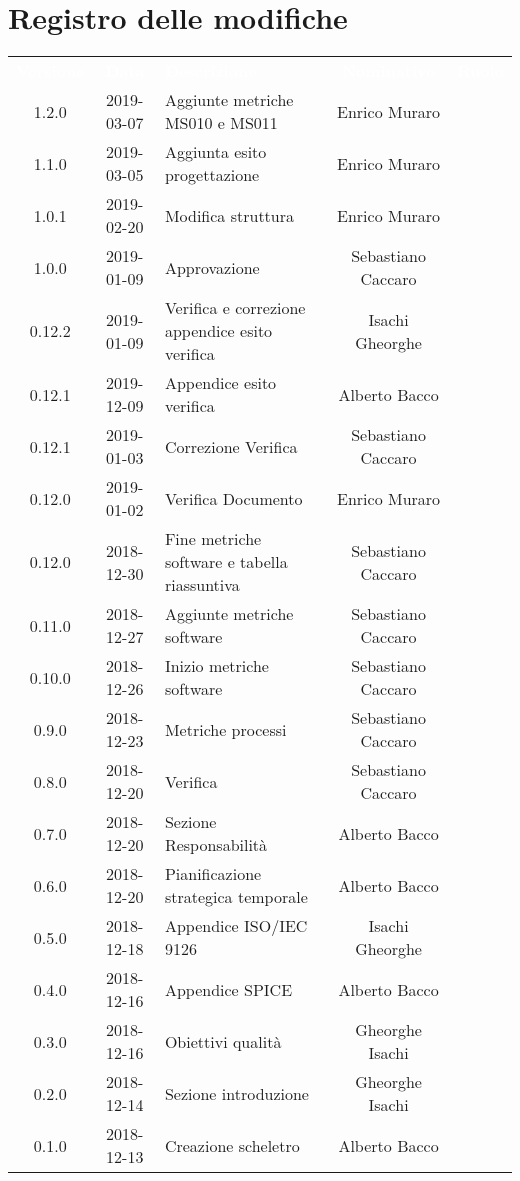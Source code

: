 \section*{Registro delle modifiche}
{
	\renewcommand{\arraystretch}{1.5}
	\centering
	\begin{longtable}{c c C{4cm} c  c }
		\textcolor{white}{\textbf{Versione}} &
		\textcolor{white}{\textbf{Data}} &
		\textcolor{white}{\textbf{Descrizione}} &
		\textcolor{white}{\textbf{Nominativo}} &
		\textcolor{white}{\textbf{Ruolo}}
		\\
		1.2.0 &
		2019-03-07 &
		Aggiunte metriche MS010 e MS011 &
		Enrico Muraro &
		\reda{}
		\\
		1.1.0 &
		2019-03-05 &
		Aggiunta esito progettazione &
		Enrico Muraro &
		\reda{}
		\\
		1.0.1 &
		2019-02-20 &
		Modifica struttura &
		Enrico Muraro &
		\reda{}
		\\
		1.0.0 &
		2019-01-09 &
		Approvazione &
		Sebastiano Caccaro &
		\Res{}
		\\
		0.12.2 &
		2019-01-09 &
		Verifica e correzione appendice esito verifica &
		Isachi Gheorghe &
		\ver{}
		\\
		0.12.1 &
		2019-12-09 &
		Appendice esito verifica &
		Alberto Bacco &
		\ver{}
		\\
		0.12.1 &
		2019-01-03 &
		Correzione Verifica &
		Sebastiano Caccaro &
		\reda{}
		\\
		0.12.0 &
		2019-01-02 &
		Verifica Documento &
		Enrico Muraro &
		\ver{}
		\\
		0.12.0 &
		2018-12-30 &
		Fine metriche software e tabella riassuntiva &
		Sebastiano Caccaro &
		\reda{}
		\\
		0.11.0 &
		2018-12-27 &
		Aggiunte metriche software  &
		Sebastiano Caccaro &
		\reda{}
		\\
		0.10.0 &
		2018-12-26 &
		Inizio metriche software &
		Sebastiano Caccaro &
		\reda{}
		\\
		0.9.0 &
		2018-12-23 &
		Metriche processi &
		Sebastiano Caccaro &
		\reda{}
		\\
		0.8.0 &
		2018-12-20 &
		Verifica &
		Sebastiano Caccaro &
		\reda{}		
		\\
		0.7.0 &
		2018-12-20 &
		Sezione Responsabilità &
		Alberto Bacco &
		\reda{}
		\\
		0.6.0 &
		2018-12-20 &
		Pianificazione strategica temporale &
		Alberto Bacco &
		\reda{}
		\\
		0.5.0 &
		2018-12-18 &
		Appendice ISO/IEC 9126 &
		Isachi Gheorghe &
		\reda{}
		\\
		0.4.0 &
		2018-12-16 &
		Appendice SPICE &
		Alberto Bacco &
		\reda{}
		\\
		0.3.0 &
		2018-12-16 &
		Obiettivi qualità &
		Gheorghe Isachi &
		\reda{}
		\\
		0.2.0 &
		2018-12-14 &
		Sezione introduzione &
		Gheorghe Isachi&
		\reda{}
		\\
		0.1.0 &
		2018-12-13 &
		Creazione scheletro &
		Alberto Bacco&
		\reda{}
		\\
	\end{longtable}

}